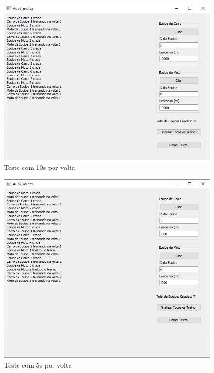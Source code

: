 \documentclass[12pt,a4paper]{article}
\begin{document}
\begin{figure}[H]
\centering
\includegraphics[width=\textwidth]{qt_teams_10s}
\caption{Teste com 10s por volta}
\label{teams_10s}
\end{figure}

\begin{figure}[H]
\centering
\includegraphics[width=\textwidth]{qt_teams}
\caption{Teste com 5s por volta}
\label{teams_5s}
\end{figure}
\end{document}
